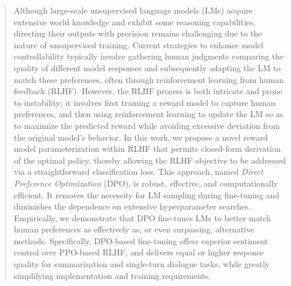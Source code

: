 \begin{abstract}
Although large-scale unsupervised language models (LMs) acquire extensive world knowledge and exhibit some reasoning capabilities, directing their outputs with precision remains challenging due to the nature of unsupervised training. Current strategies to enhance model controllability typically involve gathering human judgments comparing the quality of different model responses and subsequently adapting the LM to match these preferences, often through reinforcement learning from human feedback (RLHF). However, the RLHF process is both intricate and prone to instability; it involves first training a reward model to capture human preferences, and then using reinforcement learning to update the LM so as to maximize the predicted reward while avoiding excessive deviation from the original model's behavior. In this work, we propose a novel reward model parameterization within RLHF that permits closed-form derivation of the optimal policy, thereby allowing the RLHF objective to be addressed via a straightforward classification loss. This approach, named \textit{Direct Preference Optimization} (DPO), is robust, effective, and computationally efficient. It removes the necessity for LM sampling during fine-tuning and diminishes the dependence on extensive hyperparameter searches. Empirically, we demonstrate that DPO fine-tunes LMs to better match human preferences as effectively as, or even surpassing, alternative methods. Specifically, DPO-based fine-tuning offers superior sentiment control over PPO-based RLHF, and delivers equal or higher response quality for summarization and single-turn dialogue tasks, while greatly simplifying implementation and training requirements.
\end{abstract}

